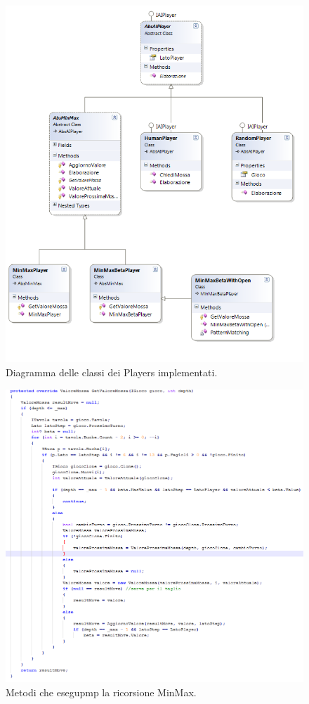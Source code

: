 \documentclass[paper=a4, fontsize=11pt]{scrartcl}	%
\numberwithin{equation}{section}															%
\numberwithin{figure}{section}																%
\numberwithin{table}{section}																%
\begin{document}
\begin{figure}[h]
\centering
        \includegraphics[totalheight=18cm]{Iplayer.png}
    \caption{Diagramma delle classi dei Players implementati.}
    \label{fig:verticalcell}
\end{figure}
\begin{figure}[h]
\centering
        \includegraphics[totalheight=22cm]{code.png}
    \caption{Metodi che esegupmp la ricorsione MinMax.}
    \label{fig:verticalcell}
\end{figure}
\end{document}

